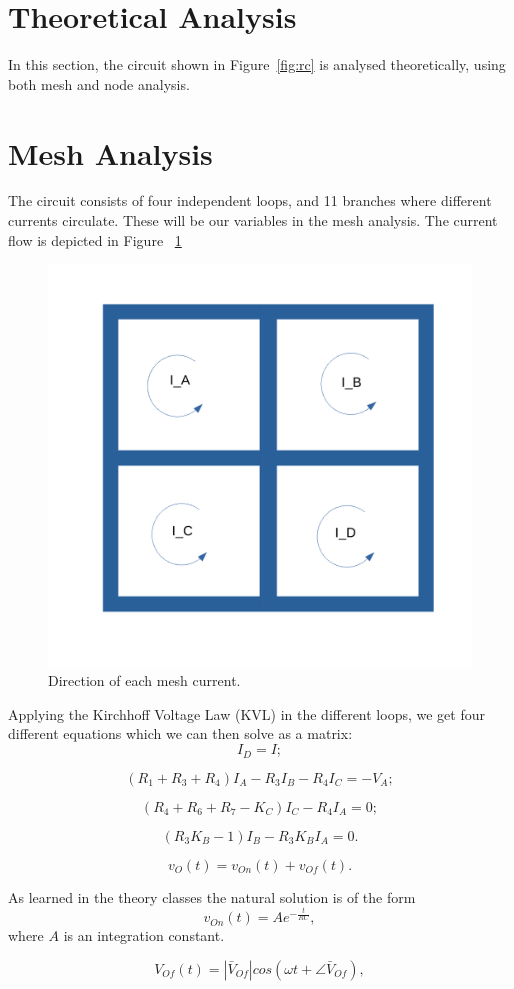 \section{Theoretical Analysis}
\label{sec:analysis}

In this section, the circuit shown in Figure~\ref{fig:rc} is analysed
theoretically, using both mesh and node analysis.

\section{Mesh Analysis}

The circuit consists of four independent loops, and 11 branches where different currents circulate. These will be our variables in the mesh analysis. The current flow is depicted in Figure ~\ref{fig:current}

\begin{figure}[h] \centering
\includegraphics[width=0.4\linewidth]{current.pdf}
\caption{Direction of each mesh current.}
\label{fig:current}
\end{figure}


Applying the Kirchhoff Voltage Law (KVL) in the different loops, we get four different equations which we can then solve as a matrix:
\begin{equation}
  I_D=I;
\end{equation}

\begin{equation}
  (R_1+R_3+R_4)I_A-R_3I_B-R_4I_C=-V_A;
\end{equation}

\begin{equation}
  (R_4+R_6+R_7-K_C)I_C-R_4I_A=0;
\end{equation}

\begin{equation}
  (R_3K_B-1)I_B-R_3K_BI_A=0.
\end{equation}


\begin{equation}
  v_O(t) = v_{On}(t) + v_{Of}(t).
  \label{eq:vo_sol}
\end{equation}

As learned in the theory classes the natural solution is of the form
\begin{equation}
  v_{On}(t) = Ae^{-\frac{t}{RC}},
  \label{eq:vo_nat}
\end{equation}
where $A$ is an integration constant.

\begin{equation}
  V_{Of}(t) = |\bar{V}_{Of}| cos(\omega t + \angle \bar{V}_{Of}),
  \label{eq:vo_for}
\end{equation}


